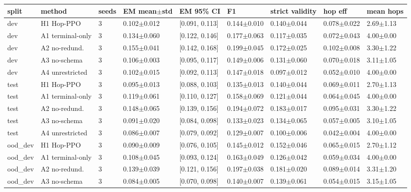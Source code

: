 \begin{tabular}{lllllllll}
\toprule
split & method & seeds & EM mean$\pm$std & EM 95\% CI & F1 & strict validity & hop eff & mean hops \\
\midrule
dev & H1 Hop-PPO & 3 & 0.102$\pm$0.012 & [0.091, 0.113] & 0.144$\pm$0.010 & 0.140$\pm$0.044 & 0.078$\pm$0.022 & 2.69$\pm$1.13 \\
dev & A1 terminal-only & 3 & 0.134$\pm$0.060 & [0.122, 0.146] & 0.177$\pm$0.063 & 0.117$\pm$0.035 & 0.072$\pm$0.043 & 4.00$\pm$0.00 \\
dev & A2 no-redund. & 3 & 0.155$\pm$0.041 & [0.142, 0.168] & 0.199$\pm$0.045 & 0.172$\pm$0.025 & 0.102$\pm$0.008 & 3.30$\pm$1.22 \\
dev & A3 no-schema & 3 & 0.106$\pm$0.003 & [0.095, 0.117] & 0.149$\pm$0.006 & 0.131$\pm$0.060 & 0.070$\pm$0.018 & 3.11$\pm$1.05 \\
dev & A4 unrestricted & 3 & 0.102$\pm$0.015 & [0.092, 0.113] & 0.147$\pm$0.018 & 0.097$\pm$0.012 & 0.052$\pm$0.010 & 4.00$\pm$0.00 \\
test & H1 Hop-PPO & 3 & 0.095$\pm$0.013 & [0.088, 0.103] & 0.135$\pm$0.013 & 0.140$\pm$0.044 & 0.069$\pm$0.011 & 2.70$\pm$1.13 \\
test & A1 terminal-only & 3 & 0.119$\pm$0.061 & [0.110, 0.127] & 0.158$\pm$0.069 & 0.121$\pm$0.044 & 0.064$\pm$0.045 & 4.00$\pm$0.00 \\
test & A2 no-redund. & 3 & 0.148$\pm$0.065 & [0.139, 0.156] & 0.194$\pm$0.072 & 0.183$\pm$0.017 & 0.095$\pm$0.031 & 3.30$\pm$1.22 \\
test & A3 no-schema & 3 & 0.091$\pm$0.020 & [0.084, 0.098] & 0.133$\pm$0.023 & 0.134$\pm$0.065 & 0.057$\pm$0.005 & 3.10$\pm$1.05 \\
test & A4 unrestricted & 3 & 0.086$\pm$0.007 & [0.079, 0.092] & 0.129$\pm$0.007 & 0.100$\pm$0.006 & 0.042$\pm$0.004 & 4.00$\pm$0.00 \\
ood\_dev & H1 Hop-PPO & 3 & 0.090$\pm$0.009 & [0.076, 0.105] & 0.145$\pm$0.012 & 0.152$\pm$0.046 & 0.065$\pm$0.015 & 2.70$\pm$1.12 \\
ood\_dev & A1 terminal-only & 3 & 0.108$\pm$0.045 & [0.093, 0.124] & 0.163$\pm$0.049 & 0.126$\pm$0.042 & 0.059$\pm$0.034 & 4.00$\pm$0.00 \\
ood\_dev & A2 no-redund. & 3 & 0.139$\pm$0.039 & [0.121, 0.156] & 0.197$\pm$0.038 & 0.181$\pm$0.020 & 0.089$\pm$0.014 & 3.31$\pm$1.20 \\
ood\_dev & A3 no-schema & 3 & 0.084$\pm$0.005 & [0.070, 0.098] & 0.140$\pm$0.007 & 0.139$\pm$0.061 & 0.054$\pm$0.015 & 3.15$\pm$1.05 \\

\end{tabular}

